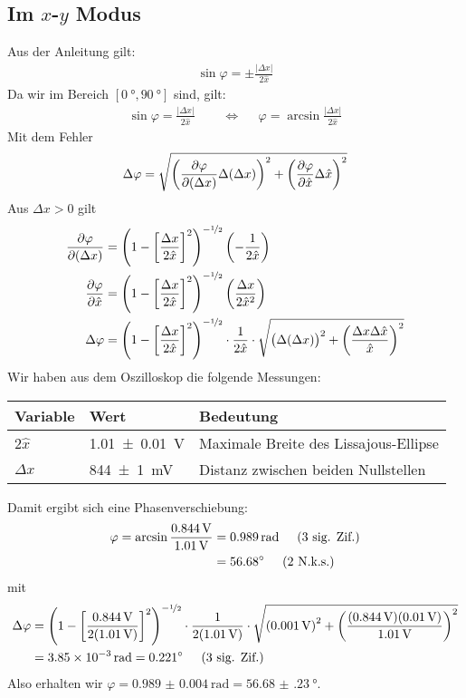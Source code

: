 	\subsection{Im $x$-$y$ Modus}
		Aus der Anleitung gilt:
		\begin{align}
			\sin\varphi = \pm \frac{|\Delta x|}{2 \hat{x}}
		\end{align}
		Da wir im Bereich $[\SI{0}{\degree}, \SI{90}{\degree}]$ sind, gilt:
		\begin{align}
			\sin\varphi = \frac{|\Delta x|}{2 \hat{x}} && &\Leftrightarrow && \varphi = \arcsin \frac{|\Delta x|}{2 \hat{x}} 
		\end{align}
		Mit dem Fehler
		\begin{align}
			\Delta \varphi = \gausserror{\varphi}{(\Delta x), \hat{x}}
		\end{align}
		Aus $\Delta x > 0$ gilt
		\begin{align}
			\pdv{\varphi}{(\Delta x)} &= \left(1-\left[\frac{\Delta x}{2 \hat{x}}\right]^2\right)^{-\nicefrac{1}{2}}\left(-\frac{1}{2 \hat{x}} \right) \\
			\pdv{\varphi}{\hat{x}} &= \left(1-\left[\frac{\Delta x}{2 \hat{x}}\right]^2\right)^{-\nicefrac{1}{2}} \left(\frac{\Delta x}{2 \hat{x}^2} \right)\\
			\Delta \varphi &= \left(1-\left[\frac{\Delta x}{2 \hat{x}}\right]^2\right)^{-\nicefrac{1}{2}} \cdot\frac{1}{2\hat{x}} \cdot \sqrt{\left(\Delta (\Delta x)\right)^2 + \left(\frac{\Delta x \Delta \hat{x}}{\hat{x}}\right)^2}
		\end{align}
		Wir haben aus dem Oszilloskop die folgende Messungen:
		\begin{center}
			\begin{tabular}{lll}
				\toprule
				Variable & Wert & Bedeutung \\
				\midrule
				$2\hat{x}$ & \SI{1.01(1)}{\volt} & Maximale Breite des Lissajous-Ellipse\\
				$\Delta x$ & \SI{844(1)}{\milli\volt} & Distanz zwischen beiden Nullstellen\\
				\bottomrule
			\end{tabular}
		\end{center}
		Damit ergibt sich eine Phasenverschiebung:
		\begin{align}
			\varphi = \arcsin \frac{\SI{0.844}{\volt}}{\SI{1.01}{\volt}} &= \SI{0.989}{\radian} \hspace{0.5cm}\text{(3 sig. Zif.)} \\
			&= \SI{56.68}{\degree} \hspace{0.5cm}\text{(2 N.k.s.)}
		\end{align}
		mit
		\begin{align}
			\Delta \varphi &= \left(1-\left[\frac{\SI{0.844}{\volt}}{2 (\SI{1.01}{\volt})}\right]^2\right)^{-\nicefrac{1}{2}} \cdot\frac{1}{2(\SI{1.01}{\volt})} \cdot \sqrt{\left(\SI{0.001}{\volt}\right)^2 + \left(\frac{(\SI{0.844}{\volt})(\SI{0.01}{\volt})}{\SI{1.01}{\volt}}\right)^2} \notag \\
			&= \SI{3.85e-3}{\radian} = \SI{0.221}{\degree} \hspace{0.5cm}\text{(3 sig. Zif.)}
		\end{align}
		Also erhalten wir $\varphi = \SI{0.989(4)}{\radian} = \SI{56.68(23)}{\degree}$.
